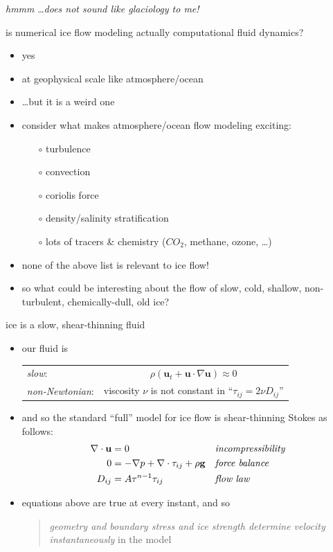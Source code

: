 \begin{frame}{\emph{hmmm} \dots \emph{does not sound like glaciology to me!}}

is numerical ice flow modeling actually computational fluid dynamics?

\begin{itemize}
\item \alert{yes}
\item at geophysical scale like atmosphere/ocean
\item \dots but it is a weird one
\item consider what makes atmosphere/ocean flow modeling exciting:
  \begin{itemize}
  \item[$\circ$] turbulence
  \item[$\circ$] convection
  \item[$\circ$] coriolis force
  \item[$\circ$] density/salinity stratification
  \item[$\circ$] lots of tracers \& chemistry ($CO_2$, methane, ozone, \dots)
  \end{itemize}
\item none of the above list is relevant to ice flow!
\item so what could be interesting about the flow of slow, cold, shallow, non-turbulent, chemically-dull, old ice?
\end{itemize}
\end{frame}


\begin{frame}{ice is a slow, shear-thinning fluid}

\begin{itemize}
\item our fluid is

\phantom{foo bar}
  \begin{tabular}{lc}
  \emph{slow}: & $\rho \left(\mathbf{u}_t + \mathbf{u}\cdot\nabla \mathbf{u}\right) \approx 0$ \\
  \emph{non-Newtonian}: & viscosity $\nu$ is not constant in ``$\tau_{ij} = 2 \nu D_{ij}$''
  \end{tabular}
\item and so the standard ``full'' model for ice flow is shear-thinning Stokes as follows:
\begin{align*}
\nabla \cdot \mathbf{u} &= 0 &&\text{\emph{incompressibility}} \\
0 &= - \nabla p + \nabla \cdot \tau_{ij} + \rho \mathbf{g} &&\text{\emph{force balance}} \\
D_{ij} &= A \tau^{n-1} \tau_{ij} &&\text{\emph{flow law}}
\end{align*}
\item equations above are true at every instant, and so
  \begin{quote}
  \emph{geometry and boundary stress and ice strength determine velocity instantaneously} in the model
  \end{quote}
\end{itemize}
\end{frame}


